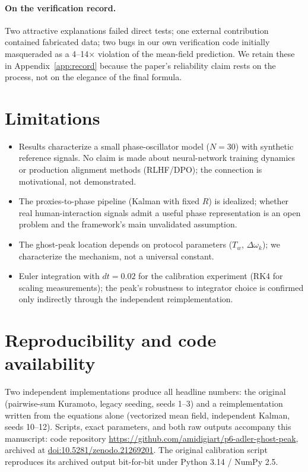 \documentclass[11pt]{article}
\newcommand{\dw}{\Delta\omega}
\begin{document}
\paragraph{On the verification record.} Two attractive explanations failed
direct tests; one external contribution contained fabricated data; two bugs in
our own verification code initially masqueraded as a 4--14$\times$ violation
of the mean-field prediction. We retain these in Appendix~\ref{app:record}
because the paper's reliability claim rests on the process, not on the
elegance of the final formula.

\section{Limitations}\label{sec:limitations}

\begin{itemize}
\item Results characterize a small phase-oscillator model ($N=30$) with
  synthetic reference signals. No claim is made about neural-network training
  dynamics or production alignment methods (RLHF/DPO); the connection is
  motivational, not demonstrated.
\item The proxies-to-phase pipeline (Kalman with fixed $R$) is idealized;
  whether real human-interaction signals admit a useful phase representation
  is an open problem and the framework's main unvalidated assumption.
\item The ghost-peak location depends on protocol parameters ($T_w$, $\dw_k$);
  we characterize the mechanism, not a universal constant.
\item Euler integration with $dt=0.02$ for the calibration experiment (RK4 for
  scaling measurements); the peak's robustness to integrator choice is
  confirmed only indirectly through the independent reimplementation.
\end{itemize}

\section{Reproducibility and code availability}

Two independent implementations produce all headline numbers: the original
(pairwise-sum Kuramoto, legacy seeding, seeds 1--3) and a reimplementation
written from the equations alone (vectorized mean field, independent Kalman,
seeds 10--12). Scripts, exact parameters, and both raw outputs accompany this
manuscript: code repository
\url{https://github.com/amidigiart/p6-adler-ghost-peak}, archived at
\href{https://doi.org/10.5281/zenodo.21269201}{doi:10.5281/zenodo.21269201}.
The original calibration script reproduces its archived output bit-for-bit
under Python 3.14 / NumPy 2.5.
\end{document}
